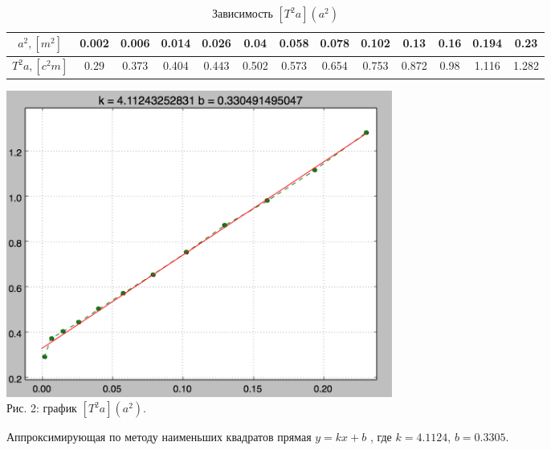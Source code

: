 \documentclass[12pt]{article}
\begin{document}
\begin{enumerate}
        \begin{table}[h]
            \caption{Зависимость $[T^2 a ](a^2)$}
            \begin{center}
                \begin{tabular}{|c|c|c|c|c|c|c|c|c|c|c|c|c|}
                    \hline
                        $a^2 , [m^2]$ & 0.002 & 0.006 & 0.014 & 0.026 & 0.04 & 0.058 & 0.078 & 0.102 & 0.13 & 0.16 & 0.194 & 0.23 \\
                    \hline
                        $T^2 a , [c^2 m] $ & 0.29 & 0.373 & 0.404 & 0.443 & 0.502 & 0.573 & 0.654 & 0.753 & 0.872 & 0.98 & 1.116 & 1.282 \\
                    \hline
                \end{tabular}
            \end{center}
        \end{table}

        \begin{center} 
            \includegraphics[width=5in]{figure.png} \\ Рис. 2: график $[T^2 a ] (a^2)$.
        \end{center}
        Аппроксимирующая по методу наименьших квадратов прямая $y = kx + b$ , где $k = 4.1124$, $b = 0.3305$.
    \end{enumerate}
\end{document}
